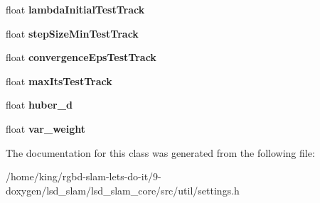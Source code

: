 \begin{DoxyCompactItemize}
\item 
\hypertarget{classlsd__slam_1_1_dense_depth_tracker_settings_af5f4fca407dd7c3176cd47618392cb90}{float {\bfseries lambda\-Initial\-Test\-Track}}\label{classlsd__slam_1_1_dense_depth_tracker_settings_af5f4fca407dd7c3176cd47618392cb90}

\item 
\hypertarget{classlsd__slam_1_1_dense_depth_tracker_settings_a9acd0bfba26db7335f9f77b4962528c4}{float {\bfseries step\-Size\-Min\-Test\-Track}}\label{classlsd__slam_1_1_dense_depth_tracker_settings_a9acd0bfba26db7335f9f77b4962528c4}

\item 
\hypertarget{classlsd__slam_1_1_dense_depth_tracker_settings_aa34fc307094ee54320363bcb7ee9444f}{float {\bfseries convergence\-Eps\-Test\-Track}}\label{classlsd__slam_1_1_dense_depth_tracker_settings_aa34fc307094ee54320363bcb7ee9444f}

\item 
\hypertarget{classlsd__slam_1_1_dense_depth_tracker_settings_a205fee0a54ed99cb47d23dae01412c10}{float {\bfseries max\-Its\-Test\-Track}}\label{classlsd__slam_1_1_dense_depth_tracker_settings_a205fee0a54ed99cb47d23dae01412c10}

\item 
\hypertarget{classlsd__slam_1_1_dense_depth_tracker_settings_a0df61880f4b7ac1766a0fe5c035dccc2}{float {\bfseries huber\-\_\-d}}\label{classlsd__slam_1_1_dense_depth_tracker_settings_a0df61880f4b7ac1766a0fe5c035dccc2}

\item 
\hypertarget{classlsd__slam_1_1_dense_depth_tracker_settings_af3ccae5a2322ce188e6c498c8ff132e2}{float {\bfseries var\-\_\-weight}}\label{classlsd__slam_1_1_dense_depth_tracker_settings_af3ccae5a2322ce188e6c498c8ff132e2}

\end{DoxyCompactItemize}


The documentation for this class was generated from the following file\-:\begin{DoxyCompactItemize}
\item 
/home/king/rgbd-\/slam-\/lets-\/do-\/it/9-\/doxygen/lsd\-\_\-slam/lsd\-\_\-slam\-\_\-core/src/util/settings.\-h\end{DoxyCompactItemize}
